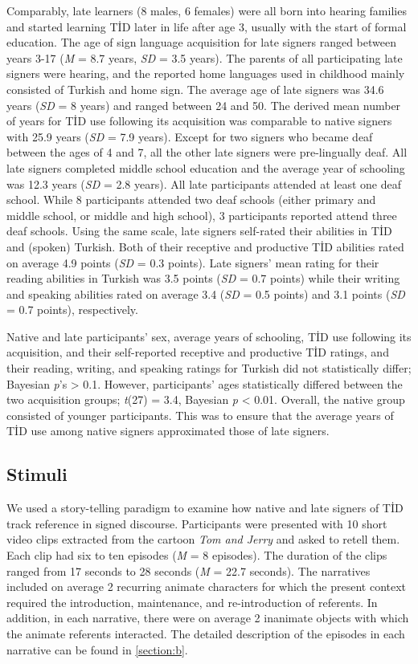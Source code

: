 \documentclass[]{elsarticle} %
\begin{document}
Comparably, late learners (8 males, 6 females) were all born into
hearing families and started learning TİD later in life after age 3,
usually with the start of formal education. The age of sign language
acquisition for late signers ranged between years 3-17 (\emph{M} = 8.7
years, \emph{SD} = 3.5 years). The parents of all participating late
signers were hearing, and the reported home languages used in childhood
mainly consisted of Turkish and home sign. The average age of late
signers was 34.6 years (\emph{SD} = 8 years) and ranged between 24 and
50. The derived mean number of years for TİD use following its
acquisition was comparable to native signers with 25.9 years (\emph{SD}
= 7.9 years). Except for two signers who became deaf between the ages of
4 and 7, all the other late signers were pre-lingually deaf. All late
signers completed middle school education and the average year of
schooling was 12.3 years (\emph{SD} = 2.8 years). All late participants
attended at least one deaf school. While 8 participants attended two
deaf schools (either primary and middle school, or middle and high
school), 3 participants reported attend three deaf schools. Using the
same scale, late signers self-rated their abilities in TİD and (spoken)
Turkish. Both of their receptive and productive TİD abilities rated on
average 4.9 points (\emph{SD} = 0.3 points). Late signers' mean rating
for their reading abilities in Turkish was 3.5 points (\emph{SD} = 0.7
points) while their writing and speaking abilities rated on average 3.4
(\emph{SD} = 0.5 points) and 3.1 points (\emph{SD} = 0.7 points),
respectively.

Native and late participants' sex, average years of schooling, TİD use
following its acquisition, and their self-reported receptive and
productive TİD ratings, and their reading, writing, and speaking ratings
for Turkish did not statistically differ; Bayesian \emph{p}'s
\textgreater{} 0.1. However, participants' ages statistically differed
between the two acquisition groups; \emph{t}(27) = 3.4, Bayesian
\emph{p} \textless{} 0.01. Overall, the native group consisted of
younger participants. This was to ensure that the average years of TİD
use among native signers approximated those of late signers.

\hypertarget{stimuli}{%
\subsection{Stimuli}\label{stimuli}}

We used a story-telling paradigm to examine how native and late signers
of TİD track reference in signed discourse. Participants were presented
with 10 short video clips extracted from the cartoon \emph{Tom and
Jerry} and asked to retell them. Each clip had six to ten episodes
(\emph{M} = 8 episodes). The duration of the clips ranged from 17
seconds to 28 seconds (\emph{M} = 22.7 seconds). The narratives included
on average 2 recurring animate characters for which the present context
required the introduction, maintenance, and re-introduction of
referents. In addition, in each narrative, there were on average 2
inanimate objects with which the animate referents interacted. The
detailed description of the episodes in each narrative can be found in
\ref{section:b}.
\end{document}
